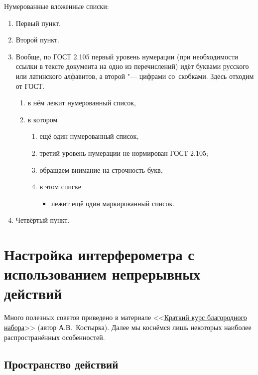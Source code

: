 \noindent Нумерованные вложенные списки:
\begin{enumerate}
    \item Первый пункт.
    \item Второй пункт.
    \item Вообще, по ГОСТ 2.105 первый уровень нумерации
          (при необходимости ссылки в тексте документа на одно из перечислений)
          идёт буквами русского или латинского алфавитов,
          а второй "--- цифрами со~скобками.
          Здесь отходим от ГОСТ.
          \begin{enumerate}
              \item в нём лежит нумерованный список,
              \item в котором
                    \begin{enumerate}
                        \item ещё один нумерованный список,
                        \item третий уровень нумерации не нормирован ГОСТ 2.105;
                        \item обращаем внимание на строчность букв,
                        \item в этом списке
                              \begin{itemize}
                                  \item лежит ещё один маркированный список.
                              \end{itemize}
                    \end{enumerate}

          \end{enumerate}

    \item Четвёртый пункт.
\end{enumerate}

\section{Настройка интерферометра с использованием непрерывных действий}

Много полезных советов приведено в материале
<<\href{https://kostyrka.ru/main/ru/typesetting-and-typography-crash-course-by-kostyrka/}{Краткий курс благородного набора}>>
(автор А.\:В.~Костырка).
Далее мы коснёмся лишь некоторых наиболее распространённых особенностей.

\subsection{Пространство действий}

